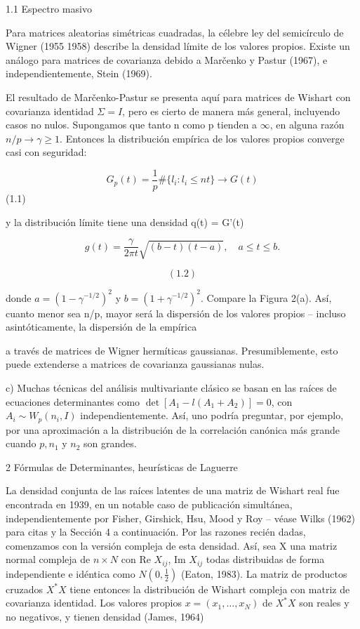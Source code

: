 \documentclass[11pt,a4paper]{article}
\begin{document}
1.1 Espectro masivo

Para matrices aleatorias simétricas cuadradas, la célebre ley del semicírculo de Wigner (1955 1958) describe la densidad límite de los valores propios. Existe un análogo para matrices de covarianza debido a Marčenko y Pastur (1967), e independientemente, Stein (1969).

El resultado de Marčenko-Pastur se presenta aquí para matrices de Wishart con covarianza identidad $\Sigma = I$, pero es cierto de manera más general, incluyendo casos no nulos. Supongamos que tanto n como p tienden a $\infty$, en alguna razón $n/p \to \gamma \ge 1$. Entonces la distribución empírica de los valores propios converge casi con seguridad:

$$G_p(t) = \frac{1}{p} \#\{l_i : l_i \le nt\} \to G(t)$$
 (1.1)

y la distribución límite tiene una densidad q(t) = G'(t)

$$g(t) = \frac{\gamma}{2\pi t} \sqrt{(b-t)(t-a)}, \quad a \le t \le b.$$

$$(1.2)$$

donde $a = (1 - \gamma^{-1/2})^2$ y $b = (1 + \gamma^{-1/2})^2$. Compare la Figura 2(a). Así, cuanto menor sea n/p, mayor será la dispersión de los valores propios – incluso asintóticamente, la dispersión de la empírica

a través de matrices de Wigner hermíticas gaussianas. Presumiblemente, esto puede extenderse a matrices de covarianza gaussianas nulas.

c) Muchas técnicas del análisis multivariante clásico se basan en las raíces de ecuaciones determinantes como $\det[A_1 - l(A_1 + A_2)] = 0$, con $A_i \sim W_p(n_i, I)$ independientemente. Así, uno podría preguntar, por ejemplo, por una aproximación a la distribución de la correlación canónica más grande cuando $p, n_1$ y $n_2$ son grandes.

2 Fórmulas de Determinantes, heurísticas de Laguerre

La densidad conjunta de las raíces latentes de una matriz de Wishart real fue encontrada en 1939, en un notable caso de publicación simultánea, independientemente por Fisher, Girshick, Hsu, Mood y Roy – véase Wilks (1962) para citas y la Sección 4 a continuación. Por las razones recién dadas, comenzamos con la versión compleja de esta densidad. Así, sea X una matriz normal compleja de $n \times N$ con Re $X_{ij}$, Im $X_{ij}$ todas distribuidas de forma independiente e idéntica como $N(0, \frac{1}{2})$ (Eaton, 1983). La matriz de productos cruzados $X^*X$ tiene entonces la distribución de Wishart compleja con matriz de covarianza identidad. Los valores propios $x = (x_1, \ldots, x_N)$ de $X^*X$ son reales y no negativos, y tienen densidad (James, 1964)
\end{document}
